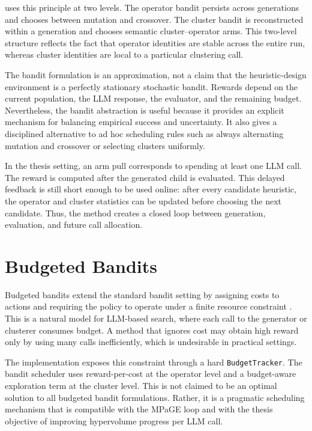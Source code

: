 \bmab{} uses this principle at two levels. The operator bandit persists across generations and chooses between mutation and crossover. The cluster bandit is reconstructed within a generation and chooses semantic cluster--operator arms. This two-level structure reflects the fact that operator identities are stable across the entire run, whereas cluster identities are local to a particular clustering call.

The bandit formulation is an approximation, not a claim that the heuristic-design environment is a perfectly stationary stochastic bandit. Rewards depend on the current population, the LLM response, the evaluator, and the remaining budget. Nevertheless, the bandit abstraction is useful because it provides an explicit mechanism for balancing empirical success and uncertainty. It also gives a disciplined alternative to ad hoc scheduling rules such as always alternating mutation and crossover or selecting clusters uniformly.

In the thesis setting, an arm pull corresponds to spending at least one LLM call. The reward is computed after the generated child is evaluated. This delayed feedback is still short enough to be used online: after every candidate heuristic, the operator and cluster statistics can be updated before choosing the next candidate. Thus, the method creates a closed loop between generation, evaluation, and future call allocation.

\section{Budgeted Bandits}

Budgeted bandits extend the standard bandit setting by assigning costs to actions and requiring the policy to operate under a finite resource constraint \cite{ding2013budgeted}. This is a natural model for LLM-based search, where each call to the generator or clusterer consumes budget. A method that ignores cost may obtain high reward only by using many calls inefficiently, which is undesirable in practical settings.

The implementation exposes this constraint through a hard \texttt{BudgetTracker}. The bandit scheduler uses reward-per-cost at the operator level and a budget-aware exploration term at the cluster level. This is not claimed to be an optimal solution to all budgeted bandit formulations. Rather, it is a pragmatic scheduling mechanism that is compatible with the MPaGE loop and with the thesis objective of improving hypervolume progress per LLM call.

